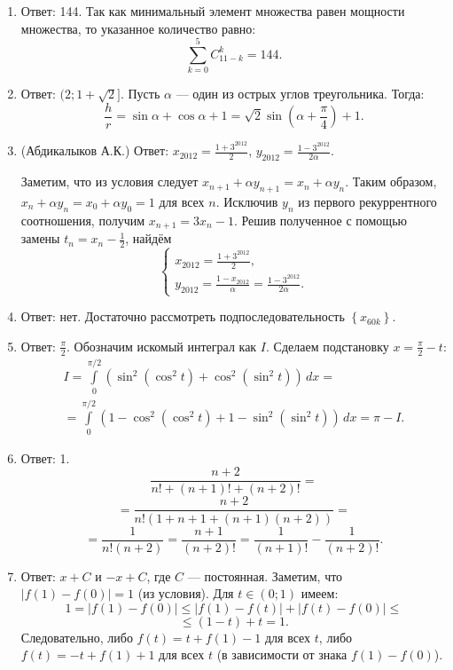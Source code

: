 \begin{enumerate}
\item Ответ: 144. Так как минимальный элемент множества равен мощности множества, то указанное количество равно:
$$\sum_{k=0}^{5} C_{11-k}^k = 144.$$

\item Ответ: $(2; 1 + \sqrt{2}]$. Пусть $\alpha$ --- один из острых углов треугольника. Тогда:
$$\frac{h}{r} = \sin{\alpha} + \cos{\alpha} + 1 = \sqrt{2} \sin\left(\alpha + \frac{\pi}{4}\right) + 1.$$

\item (Абдикалыков А.К.) Ответ: $x_{2012}=\frac{1+3^{2012}}{2}$, $y_{2012}=\frac{1-3^{2012}}{2\alpha}.$

Заметим, что из условия следует $x_{n+1}+\alpha y_{n+1}=x_n+\alpha y_n$. Таким образом, $x_n+\alpha y_n=x_0+\alpha y_0=1$ для всех $n$. Исключив $y_n$ из первого рекуррентного соотношения, получим $x_{n+1}=3x_n-1$. Решив полученное с помощью замены $t_n=x_n-\displaystyle\frac{1}{2}$, найдём
$$
\begin{cases}
x_{2012}=\frac{1+3^{2012}}{2}, \\ y_{2012}=\displaystyle\frac{1-x_{2012}}{\alpha}=\frac{1-3^{2012}}{2\alpha}.
\end{cases}
$$

\item Ответ: нет. Достаточно рассмотреть подпоследовательность $\left\lbrace x_{60k} \right\rbrace$.

\item Ответ: $\frac{\pi}{2}$. Обозначим искомый интеграл как $I$. Сделаем подстановку $x=\displaystyle\frac{\pi}{2}-t$:
\begin{multline*}
I=\int\limits_{0}^{\pi/2}\left(\sin^2\left(\cos^2t\right)+\cos^2\left(\sin^2t\right)\right)\,dx=\\
=\int\limits_{0}^{\pi/2}\left(1-\cos^2\left(\cos^2t\right)+1-\sin^2\left(\sin^2t\right)\right)\,dx=\pi-I.
\end{multline*}

\item Ответ: 1. 
$$\frac{n+2}{n!+(n+1)!+(n+2)!}=$$
$$=\frac{n+2}{n!(1+n+1+(n+1)(n+2))}=$$
$$=\frac{1}{n!(n+2)}=\frac{n+1}{(n+2)!}=\frac{1}{(n+1)!}-\frac{1}{(n+2)!}.$$

\item Ответ: $x+C$ и $-x+C$, где $C$ --- постоянная. Заметим, что $|f(1)-f(0)| = 1$ (из условия). Для $t \in (0; 1)$ имеем: 
$$1 = |f(1) - f(0)| \leqslant |f(1) - f(t)| + |f(t) - f(0)| \leqslant$$
$$\leqslant (1 - t) + t = 1.$$
Следовательно, либо $f(t) = t + f(1) - 1$ для всех $t$, либо $f(t) = -t + f(1) + 1$ для всех $t$ (в зависимости от знака $f(1) - f(0)$).


\end{enumerate}
